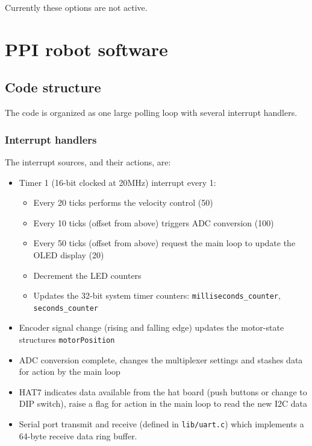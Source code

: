 \documentclass[11pt,fleqn]{article}
\begin{document}
Currently these options are not active.




\section{PPI robot software}


\subsection{Code structure}
The code is organized as one large polling loop with several interrupt handlers.

\subsubsection{Interrupt handlers}
The interrupt sources, and their actions, are:
\begin{itemize}
\item Timer 1 (16-bit clocked at 20\unit{MHz}) interrupt every 1\ms:
\begin{itemize}
\item Every 20 ticks performs the velocity control (50\Hz)
\item Every 10 ticks (offset from above) triggers ADC conversion (100\Hz)
\item Every 50 ticks (offset from above) request the main loop to update the OLED display (20\Hz)
\item Decrement the LED counters
\item Updates the 32-bit system timer counters: \texttt{milliseconds\_counter}, \texttt{seconds\_counter}
\end{itemize}
\item Encoder signal change (rising and falling edge) updates the motor-state structures \texttt{motorPosition}
\item ADC conversion complete, changes the multiplexer settings and stashes data for action by the main loop
\item HAT7 indicates data available from the hat board (push buttons or change to DIP switch), raise a flag for action in the main loop to read the new I2C data
\item Serial port transmit and receive (defined in \texttt{lib/uart.c}) which implements a 64-byte receive data ring buffer.
\end{itemize}
\end{document}
